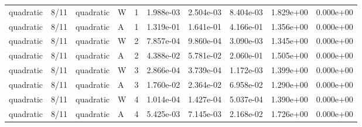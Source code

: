 \begin{tabular}{llllllllll}
quadratic & 8/11 & quadratic & W & 1 & 1.988e-03 & 2.504e-03 & 8.404e-03 & 1.829e+00 & 0.000e+00 \\
quadratic & 8/11 & quadratic & A & 1 & 1.319e-01 & 1.641e-01 & 4.166e-01 & 1.356e+00 & 0.000e+00 \\
quadratic & 8/11 & quadratic & W & 2 & 7.857e-04 & 9.860e-04 & 3.090e-03 & 1.345e+00 & 0.000e+00 \\
quadratic & 8/11 & quadratic & A & 2 & 4.388e-02 & 5.781e-02 & 2.060e-01 & 1.505e+00 & 0.000e+00 \\
quadratic & 8/11 & quadratic & W & 3 & 2.866e-04 & 3.739e-04 & 1.172e-03 & 1.399e+00 & 0.000e+00 \\
quadratic & 8/11 & quadratic & A & 3 & 1.760e-02 & 2.364e-02 & 6.958e-02 & 1.290e+00 & 0.000e+00 \\
quadratic & 8/11 & quadratic & W & 4 & 1.014e-04 & 1.427e-04 & 5.037e-04 & 1.390e+00 & 0.000e+00 \\
quadratic & 8/11 & quadratic & A & 4 & 5.425e-03 & 7.145e-03 & 2.168e-02 & 1.726e+00 & 0.000e+00 \\
\bottomrule
\end{tabular}
